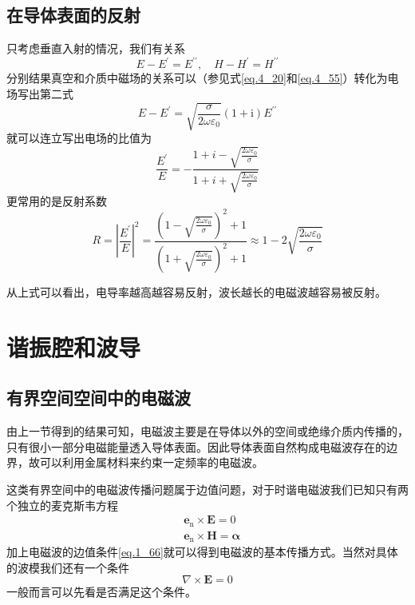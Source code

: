     \subsection{在导体表面的反射}
        只考虑垂直入射的情况，我们有关系\[E - E^\prime = E^{\prime \prime}, \quad H- H^\prime=H^{\prime \prime}\]分别结果真空和介质中磁场的关系可以（参见式\ref{eq.4_20}和\ref{eq.4_55}）转化为电场写出第二式\[E-E^{\prime}=\sqrt{\frac{\sigma}{2 \omega \varepsilon_{0}}}(1+\mathrm{i}) E^{\prime \prime}\]就可以连立写出电场的比值为
        \begin{equation}
            \frac{E^\prime}{E} = -\frac{1+i-\sqrt{\frac{2 \omega \varepsilon_0}{\sigma}}}{1+i+\sqrt{\frac{2 \omega \varepsilon_0}{\sigma}}}
        \end{equation}
        更常用的是反射系数
        \begin{equation}
            R=\left|\frac{E^{\prime}}{E}\right|^{2}=\frac{\left(1-\sqrt{\frac{2 \omega \varepsilon_{0}}{\sigma}}\right)^{2}+1}{\left(1+\sqrt{\frac{2 \omega \varepsilon_{0}}{\sigma}}\right)^{2}+1} \approx 1-2 \sqrt{\frac{2 \omega \varepsilon_{0}}{\sigma}}
        \end{equation}

        从上式可以看出，电导率越高越容易反射，波长越长的电磁波越容易被反射。
\section{谐振腔和波导}
    \subsection{有界空间空间中的电磁波}
        由上一节得到的结果可知，电磁波主要是在导体以外的空间或绝缘介质内传播的，只有很小一部分电磁能量透入导体表面。因此导体表面自然构成电磁波存在的边界，故可以利用金属材料来约束一定频率的电磁波。

        这类有界空间中的电磁波传播问题属于边值问题，对于时谐电磁波我们已知只有两个独立的麦克斯韦方程
        \begin{equation}
            \begin{aligned}
            &\boldsymbol{e}_{\mathrm{n}} \times \boldsymbol{E}=0 \\
            &\boldsymbol{e}_{\mathrm{n}} \times \boldsymbol{H}=\boldsymbol{\alpha}
            \end{aligned}
        \end{equation}
        加上电磁波的边值条件\ref{eq.1_66}就可以得到电磁波的基本传播方式。当然对具体的波模我们还有一个条件\[\nabla \times \boldsymbol{E}=0\]一般而言可以先看是否满足这个条件。
